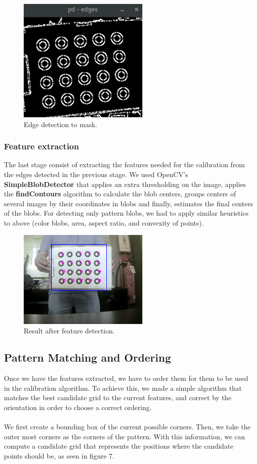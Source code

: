\documentclass[journal]{IEEEtran}
\begin{document}
\begin{figure}[H]
\centering
\includegraphics[width=2.5in]{_img/img_report2_edges.png}
\caption{Edge detection to mask.}
\end{figure}

\subsubsection{Feature extraction}
The last stage consist of extracting the features needed for the calibration from the edges detected in the previous stage. We used OpenCV's \textbf{SimpleBlobDetector} that applies an extra thresholding on the image, applies the \textbf{findContours} algorithm to calculate the blob centers, groups centers of several images by their coordinates in blobs and finally, estimates the final centers of the blobs. For detecting only pattern blobs, we had to apply similar heuristics to above (color blobs, area, aspect ratio, and convexity of points).

\begin{figure}[H]
\centering
\includegraphics[width=2.5in]{_img/img_report2_feature_detection.png}
\caption{Result after feature detection.}
\end{figure}

\subsection{Pattern Matching and Ordering}
Once we have the features extracted, we have to order them for them to be used in the calibration algorithm. To achieve this, we made a simple algorithm that matches the best candidate grid to the current features, and correct by the orientation in order to choose a correct ordering.
\\
\\
We first create a bounding box of the current possible corners. Then, we take the outer most corners as the corners of the pattern. With this information, we can compute a candidate grid that represents the positions where the candidate points should be, as seen in figure 7.
\end{document}
